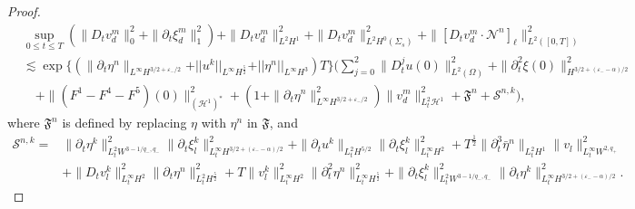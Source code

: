\documentclass[letterpaper,reqno,10pt,twoside]{amsart}
\theoremstyle{definition}
\theoremstyle{remark}
\def\p{\partial}
\def\Om{\Omega}
\begin{document}
\begin{proof}
		
		\begin{equation}\label{eq:pa_tu_m1}
			\begin{aligned}
				&\sup_{0\le t\le T}(\|D_tv_{d}^m\|_{0}^2+\|\p_t\xi_{d}^m\|_1^2)+\|D_tv_{d}^m\|_{L^2H^1}^2+\|D_tv_{d}^m\|_{L^2H^0(\Sigma_s)}^2+\|[D_tv_{d}^m\cdot\mathcal{N}^{n}]_\ell\|_{L^2([0,T])}^2\\
				&\lesssim \exp\big\{(\|\p_t\eta^{n}\|_{L^\infty H^{3/2+\varepsilon_-/2}}+\vert \vert u^{k}\vert \vert_{L^{\infty}H^{\frac{5}{2}}}+\vert \vert \eta^{n}\vert \vert_{L^{\infty}H^{3}})T\big\}\bigg( 
				\sum_{j=0}^{2}\|D_t^{j}u(0)\|_{L^2(\Om)}^2+\|\p_t^{2}\xi(0)\|_{H^{3/2+(\varepsilon_--\alpha)/2}}^2\\
				&\quad +\|(F^1-F^4-F^5)(0)\|_{(\mathcal{H}^1)^\ast}^2
				+(1+\|\p_t\eta^n\|_{L^\infty H^{3/2+\varepsilon_-/2}}^2)\|v_{d}^m\|_{L_{t}^{2}\mathcal{H}^1}^2 +\mathfrak{F}^{n} +\mathscr{S}^{n, k} \bigg),
			\end{aligned}
		\end{equation}
		where $\mathfrak{F}^{n}$ is defined by replacing $\eta$ with $\eta^{n}$ in $\mathfrak{F}$, and
		\[
		\begin{aligned}
			\mathscr{S}^{n, k}=&\|\partial_{t}\eta^{k}\|^{2}_{L_{t}^{2}W^{3-1/q_{-},q_{-}}}
			\|\partial_{t}\xi_{l}^{k}\|^{2}_{L_{t}^{\infty}H^{3/2+(\varepsilon_{-}-\alpha)/2}}
			+\|\partial_{t}u^{k}\|_{L_{t}^{2}H^{5/2}}
			\|\partial_{t}\xi_{l}^{k}\|_{L_{t}^{\infty}H^{2}}^{2}+T^{\frac{1}{2}}\|\p_{t}^{3}\bar{\eta}^{n}\|_{L_{t}^{2}H^{1}}\|v_{l}\|_{L_{t}^{\infty}W^{2,q_{+}}}^{2}
			\\
			&+ \|D_{t}v_{l}^{k}\|^{2}_{L_{t}^{\infty}H^{2}}\|\p_{t}\eta^{n}\|^{2}_{L_{t}^{2}H^{\frac{5}{2}}}+T\|v_{l}^{k}\|^{2}_{L_{t}^{\infty}H^{2}}\|\p_{t}^{2}\eta^{n}\|^{2}_{L_{t}^{\infty}H^{\frac{5}{2}}}
			+\|\partial_{t}\xi_{l}^{k}\|^{2}_{L_{t}^{2}W^{3-1/q_{-},q_{-}}}
			\|\partial_{t}\eta^{k}\|^{2}_{L_{t}^{\infty}H^{3/2+(\varepsilon_{-}-\alpha)/2}}.
		\end{aligned}
		\]
		

\end{proof}
\end{document}
